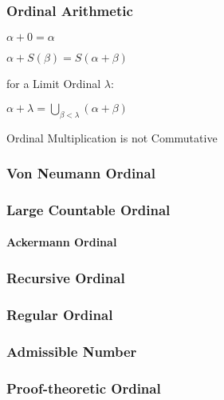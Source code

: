 \subsubsection{Ordinal Arithmetic}\label{sec:ordinal_arithmetic}

$\alpha + 0 = \alpha$

$\alpha + S(\beta) = S(\alpha + \beta)$

for a Limit Ordinal $\lambda$:

$\alpha + \lambda = \bigcup_{\beta < \lambda} (\alpha + \beta)$

Ordinal Multiplication is not Commutative



\subsubsection{Von Neumann Ordinal}\label{sec:vonneumann_ordinal}

\subsubsection{Large Countable Ordinal}\label{sec:large_countable}

\paragraph{Ackermann Ordinal}\label{sec:ackermann_ordinal}\hfill



\subsubsection{Recursive Ordinal}\label{sec:recursive_ordinal}

\subsubsection{Regular Ordinal}\label{sec:regular_ordinal}

\subsubsection{Admissible Number}\label{sec:admissible_ordinal}

\subsubsection{Proof-theoretic Ordinal}\label{sec:proof_ordinal}

